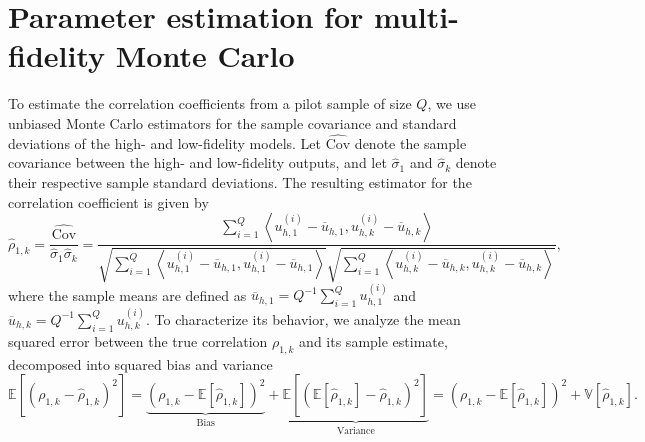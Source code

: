 \section{Parameter estimation for multi-fidelity Monte Carlo}\label{sec:Parameter_Estimation}

To estimate the correlation coefficients from a pilot sample of size $Q$, we use unbiased Monte Carlo estimators for the sample covariance and standard deviations of the high- and low-fidelity models. Let $\widehat{\text{Cov}}$ denote the sample covariance between the high- and low-fidelity outputs, and let $\widehat\sigma_1$ and $\widehat\sigma_k$ denote their respective sample standard deviations. The resulting estimator for the correlation coefficient is given by
%
\[
\widehat\rho_{1,k} = \frac{\widehat{\text{Cov}}}{\widehat\sigma_1 \widehat\sigma_k} = \frac{\sum_{i=1}^Q\left\langle u_{h,1}^{(i)} - \overline{u}_{h,1},  u_{h,k}^{(i)} - \overline{u}_{h,k} \right\rangle}{\sqrt{\sum_{i=1}^Q \left\langle u_{h,1}^{(i)} - \overline{u}_{h,1}, u_{h,1}^{(i)} - \overline{u}_{h,1} \right\rangle} \sqrt{\sum_{i=1}^Q \left\langle u_{h,k}^{(i)} - \overline{ u}_{h,k}, u_{h,k}^{(i)} - \overline{u}_{h,k} \right\rangle}},
\]
%
where the sample means are defined as $\overline{u}_{h,1} = Q^{-1}\sum_{i=1}^Q u_{h,1}^{(i)}$ and $\overline{  u}_{h,k} = Q^{-1}\sum_{i=1}^Q u_{h,k}^{(i)}$.  To characterize its behavior, we analyze the mean squared error between the true correlation $\rho_{1,k}$ and its sample estimate, decomposed into squared bias and variance
%
\begin{equation}
\label{eq:MSE_rho}
    \mathbb{E}\left[\left(\rho_{1,k} - \widehat\rho_{1,k}\right)^2\right]= \underbrace{\left(\rho_{1,k} - \mathbb{E}\left[\widehat\rho_{1,k}\right]\right)^2}_{\text{Bias}}+\underbrace{\mathbb{E}\left[\left( \mathbb{E}\left[\widehat\rho_{1,k}\right]-\widehat\rho_{1,k}\right)^2\right]}_{\text{Variance}}=\left(\rho_{1,k} - \mathbb{E}\left[\widehat\rho_{1,k}\right]\right)^2+\mathbb{V}\left[\widehat\rho_{1,k}\right].
\end{equation}
%

